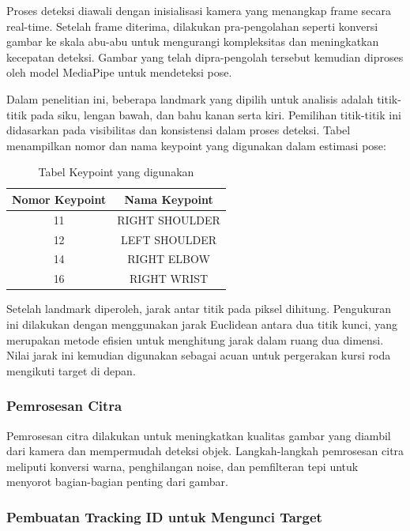 Proses deteksi diawali dengan inisialisasi kamera yang menangkap frame secara real-time. Setelah frame diterima, dilakukan pra-pengolahan seperti konversi gambar ke skala abu-abu untuk mengurangi kompleksitas dan meningkatkan kecepatan deteksi. Gambar yang telah dipra-pengolah tersebut kemudian diproses oleh model MediaPipe untuk mendeteksi pose.

Dalam penelitian ini, beberapa landmark yang dipilih untuk analisis adalah titik-titik pada siku, lengan bawah, dan bahu kanan serta kiri. Pemilihan titik-titik ini didasarkan pada visibilitas dan konsistensi dalam proses deteksi. Tabel menampilkan nomor dan nama keypoint yang digunakan dalam estimasi pose:

\begin{table}[H]
  \centering
  \caption{Tabel Keypoint yang digunakan}
  \label{tab:keypoints}
  \begin{tabular}{|c|c|}
    \hline
    Nomor Keypoint & Nama Keypoint \\
    \hline
    11 & RIGHT SHOULDER \\
    12 & LEFT SHOULDER \\
    14 & RIGHT ELBOW \\
    16 & RIGHT WRIST \\
    \hline
  \end{tabular}
\end{table}

Setelah landmark diperoleh, jarak antar titik pada piksel dihitung. Pengukuran ini dilakukan dengan menggunakan jarak Euclidean antara dua titik kunci, yang merupakan metode efisien untuk menghitung jarak dalam ruang dua dimensi. Nilai jarak ini kemudian digunakan sebagai acuan untuk pergerakan kursi roda mengikuti target di depan.

\subsubsection{Pemrosesan Citra}
\label{subsubsec:pemrosesan_citra}

Pemrosesan citra dilakukan untuk meningkatkan kualitas gambar yang diambil dari kamera dan mempermudah deteksi objek. Langkah-langkah pemrosesan citra meliputi konversi warna, penghilangan noise, dan pemfilteran tepi untuk menyorot bagian-bagian penting dari gambar.

\subsubsection*{Pembuatan Tracking ID untuk Mengunci Target}
\label{subsubsec:tracking_id}

